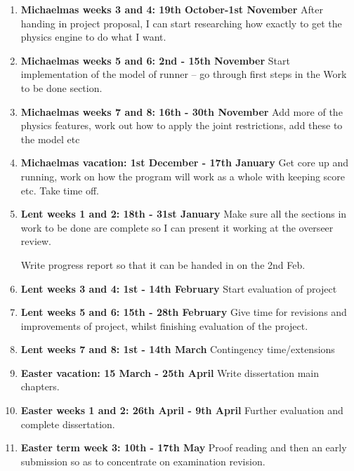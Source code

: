 \documentclass[12pt,a4paper,twoside]{article}
\begin{document}
\begin{enumerate}

\item \textbf{Michaelmas weeks 3 and 4: 19th October-1st November} After handing in project proposal, I can start researching how exactly to get the physics engine to do what I want.

\item \textbf{Michaelmas weeks 5 and 6: 2nd - 15th November} Start implementation of the model of runner -- go through first steps in the Work to be done section.

\item \textbf{Michaelmas weeks 7 and 8: 16th - 30th November}
Add more of the physics features, work out how to apply the joint restrictions, add these to the model etc

\item \textbf{Michaelmas vacation: 1st December - 17th January}
Get core up and running, work on how the program will work as a whole with keeping score etc. Take time off.

\item \textbf{Lent weeks 1 and 2: 18th - 31st January}
Make sure all the sections in work to be done are complete so I can present it working at the overseer review.

Write progress report so that it can be handed in on the 2nd Feb. 

\item \textbf{Lent weeks 3 and 4: 1st - 14th February}
Start evaluation of project

\item \textbf{Lent weeks 5 and 6: 15th - 28th February}
Give time for revisions and improvements of project, whilst finishing evaluation of the project.

\item \textbf{Lent weeks 7 and 8: 1st - 14th March}
Contingency time/extensions

\item \textbf{Easter vacation: 15 March - 25th April}
Write dissertation main chapters.

\item \textbf{Easter weeks 1 and 2: 26th April - 9th April}
Further evaluation and complete dissertation.

\item \textbf{Easter term week 3: 10th - 17th May}
Proof reading and then an early submission so as to concentrate on examination revision.

\end{enumerate}
\end{document}
